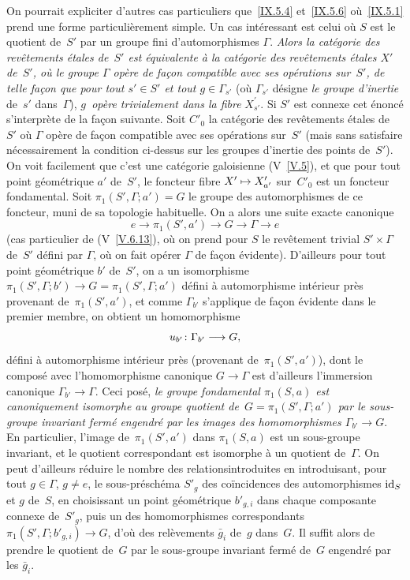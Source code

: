 \begin{remarque}
\label{IX.5.8}
On pourrait expliciter d'autres cas particuliers que~\ref{IX.5.4}
et~\ref{IX.5.6} o\`u~\ref{IX.5.1} prend une forme
particuli\`erement simple. Un cas int\'eressant est celui o\`u
$S$ est le quotient de~$S'$ par un groupe fini d'automorphismes
$\Gamma$. \emph{Alors la catégorie des revêtements étales
de~$S'$ est équivalente à la catégorie des revêtements
étales $X'$ de~$S'$, où le groupe $\Gamma$ opère de fa\c con compatible avec ses opérations sur~$S'$, de telle fa\c con
que pour tout $s'\in S'$ et tout $g\in \Gamma_{s'}$} (o\`u
$\Gamma_{s'}$ d\'esigne \emph{le groupe d'inertie} de~$s'$
dans~$\Gamma$), \emph{$g$~opère trivialement dans la fibre}
$X_{s'}^\prime$. Si $S'$ est connexe cet \'enonc\'e
s'interpr\`ete de la fa\c con suivante. Soit $C'_0$ la
cat\'egorie des rev\^etements \'etales de~$S'$ o\`u $\Gamma$
op\`ere de fa\c con compatible avec ses op\'erations sur~$S'$
(mais sans satisfaire n\'ecessairement la condition ci-dessus sur
les groupes d'inertie des points de~$S'$). On voit facilement que
c'est une cat\'egorie galoisienne (V~\ref{V.5}), et que pour
tout point g\'eom\'etrique $a'$ de~$S'$, le foncteur fibre
$X'\mto X_{a'}'$ sur~$C'_0$ est un foncteur fondamental. Soit
$\pi_1(S',\Gamma;a')=G$ le groupe des automorphismes de ce foncteur,
muni de sa topologie habituelle. On a alors une suite exacte canonique
$$
e\to \pi_1(S',a')\to G\to \Gamma\to e
$$
(cas particulier de (V~\ref{V.6.13}), o\`u on prend pour $S$ le
rev\^etement trivial $S'\times \Gamma$ de~$S'$ d\'efini par
$\Gamma$, o\`u on fait op\'erer $\Gamma$ de fa\c con
\'evidente). D'ailleurs pour tout point g\'eom\'etrique $b'$
de~$S'$, on a un isomorphisme $\pi_1(S', \Gamma ; b' )\to G =
\pi_1(S', \Gamma; a')$ d\'efini \`a automorphisme int\'erieur
pr\`es provenant de~$\pi_1(S',a')$, et comme $\Gamma_{b'}$
s'applique de fa\c con \'evidente dans le premier membre, on
obtient un homomorphisme
$$
u_{b'}\colon \Gamma_{b'}\to G \quoi,
$$
d\'efini \`a automorphisme int\'erieur pr\`es (provenant
de~$\pi_1(S',a')$),
dont le compos\'e avec l'homomorphisme canonique
$G\to \Gamma$ est d'ailleurs l'immersion canonique $\Gamma_{b'} \to
\Gamma$. Ceci pos\'e, \emph{le groupe fondamental $\pi_1(S,a)$
\emph{est} canoniquement isomorphe au groupe quotient de~$G =
\pi_1(S', \Gamma; a')$ par le sous-groupe invariant fermé
engendré par les images des homomorphismes $\Gamma_{b'} \to
G$}. En particulier, l'image de~$\pi_1(S',a')$ dans $\pi_1(S,a)$ est
un sous-groupe invariant, et le quotient correspondant est isomorphe
\`a un quotient de~$\Gamma$. On peut d'ailleurs r\'eduire le
nombre des \og relations\fg introduites en introduisant, pour tout $g\in
\Gamma$, $ g\neq e$, le sous-pr\'esch\'ema $S'_g$ des
co\"incidences des automorphismes $\mathrm{id}_S$ et $g$ de~$S$, en
choisissant un point g\'eom\'etrique $b'_{g,i}$ dans chaque
composante connexe de~$S'_g$, puis un des homomorphismes
correspondants $\pi_1(S',\Gamma; b'_{g,i})\to G$, d'o\`u des
rel\`evements $\bar{g}_i$ de~$g$ dans~$G$. Il suffit alors de
prendre le quotient de~$G$ par le sous-groupe invariant ferm\'e
de~$G$ engendr\'e par les $\bar{g}_i$.


\end{remarque}
